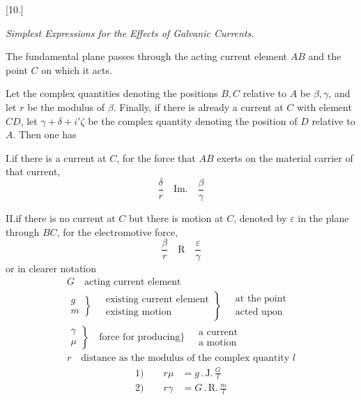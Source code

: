 \begin{center}[10.]\par\medskip\textit{Simplest Expressions for the Effects of Galvanic Currents.}\end{center}
The fundamental plane passes through the acting current element $AB$ and the point $C$ on which it acts.

Let the complex quantities denoting the positions $B,C$ relative to $A$ be $\beta,\gamma$, and let $r$ be the modulus of $\beta$. Finally, if there is already a current at $C$ with element $CD$, let $\gamma+\delta+i'\zeta$ be the complex quantity denoting the position of $D$ relative to $A$. Then one has

I.\quad if there is a current at $C$, for the force that $AB$ exerts on the material carrier of that current,
\[
\frac{\delta}{r}\quad\mathrm{Im.}\quad\frac{\beta}{\gamma}
\]

II.\quad if there is no current at $C$ but there is motion at $C$, denoted by $\varepsilon$ in the plane through $BC$, for the electromotive force,
\[
\frac{\beta}{r}\quad\mathrm R\quad\frac{\varepsilon}{\gamma}
\]
or in clearer notation
\[
\begin{gathered}
G\quad\text{acting current element}\\[4pt]
\left.\begin{gathered}g\\m\end{gathered}\right\}\quad
\left.\begin{gathered}\text{existing current element}\\\text{existing motion}\end{gathered}\right\}\quad
\begin{gathered}\text{at the point}\\\text{acted upon}\end{gathered}\\[4pt]
\left.\begin{gathered}\gamma\\\mu\end{gathered}\right\}\quad
\text{force for producing}\Bigg\}\quad
\begin{gathered}\text{a current}\\\text{a motion}\end{gathered}\\[4pt]
r\quad\text{distance as the modulus of the complex quantity }l
\end{gathered}
\]
\[
\begin{aligned}
\text{1)}\qquad r\mu&=g\,.\,\mathrm{J.}\,\frac{G}{l}\\[4pt]
\text{2)}\qquad r\gamma&=G\,.\,\mathrm{R.}\,\frac{m}{l}
\end{aligned}
\]

